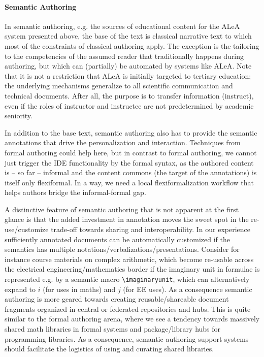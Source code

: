 \documentclass[runningheads]{llncs}
\newcommand\ALeA{\textsf{ALeA}\xspace}
\begin{document}
\paragraph{Semantic Authoring}
In semantic authoring, e.g. the \sTeX sources of educational content for the \ALeA system
presented above, the base of the text is classical narrative text to which most of the
constraints of classical authoring apply.
The exception is the tailoring to the competencies of the assumed reader
that traditionally happens during authoring, but which can (partially) be automated by systems like
\ALeA. Note that it is not a restriction that \ALeA is initially targeted to tertiary
education; the underlying mechanisms generalize to all scientific communication and
technical documents. After all, the purpose is to transfer information (instruct), even if
the roles of instructor and instructee are not predetermined by academic seniority.

In addition to the base text, semantic authoring also has to provide the semantic
annotations that drive the personalization and interaction. Techniques from formal
authoring could help here, but in contrast to formal authoring, we cannot just trigger the
IDE functionality by the formal syntax, as the authored content is -- so far -- informal
and the content commons (the target of the annotations) is itself only flexiformal. In a
way, we need a local flexiformalization workflow that helps authors bridge the
informal-formal gap.

A distinctive feature of semantic authoring that is not apparent at the first glance is
that the added investment in annotation moves the sweet spot in the re-use/customize
trade-off towards sharing and interoperability. In our experience sufficiently annotated
documents can be automatically customized if the semantics has multiple
notations/verbalizations/presentations. Consider for instance course materials on complex
arithmetic, which become re-usable across the electrical engineering/mathematics border if
the imaginary unit in formulae is represented e.g. by a semantic macro
\lstinline|\imaginaryunit|, which can alternatively expand to $i$ (for uses in maths) and
$j$ (for EE uses). As a consequence semantic authoring is more geared towards creating
reusable/shareable document fragments organized in central or federated repositories and
hubs. This is quite similar to the formal authoring arena, where we see a tendency towards
massively shared math libraries in formal systems and package/library hubs for programming
libraries. As a consequence, semantic authoring support systems should facilitate the
logistics of using and curating shared libraries.
\end{document}
